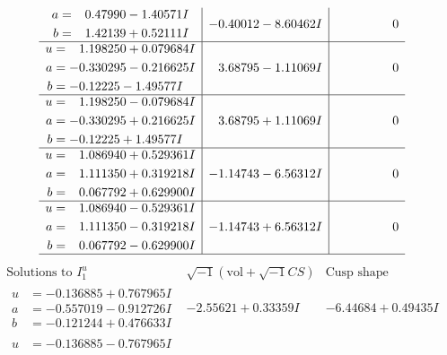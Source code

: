 \documentclass[1p]{elsarticle_modified}
\theoremstyle{definition}
\newcommand{\I}{\sqrt{-1}}
\begin{document}
$$\begin{array}{c|c|c}
\begin{aligned}
a &= \phantom{-}0.47990 - 1.40571 I \\
b &= \phantom{-}1.42139 + 0.52111 I\end{aligned}
 & -0.40012 - 8.60462 I & \phantom{-0.000000 } 0 \\ \hline\begin{aligned}
u &= \phantom{-}1.198250 + 0.079684 I \\
a &= -0.330295 - 0.216625 I \\
b &= -0.12225 - 1.49577 I\end{aligned}
 & \phantom{-}3.68795 - 1.11069 I & \phantom{-0.000000 } 0 \\ \hline\begin{aligned}
u &= \phantom{-}1.198250 - 0.079684 I \\
a &= -0.330295 + 0.216625 I \\
b &= -0.12225 + 1.49577 I\end{aligned}
 & \phantom{-}3.68795 + 1.11069 I & \phantom{-0.000000 } 0 \\ \hline\begin{aligned}
u &= \phantom{-}1.086940 + 0.529361 I \\
a &= \phantom{-}1.111350 + 0.319218 I \\
b &= \phantom{-}0.067792 + 0.629900 I\end{aligned}
 & -1.14743 - 6.56312 I & \phantom{-0.000000 } 0 \\ \hline\begin{aligned}
u &= \phantom{-}1.086940 - 0.529361 I \\
a &= \phantom{-}1.111350 - 0.319218 I \\
b &= \phantom{-}0.067792 - 0.629900 I\end{aligned}
 & -1.14743 + 6.56312 I & \phantom{-0.000000 } 0\\
 \hline 
 \end{array}$$\newpage$$\begin{array}{c|c|c}  
\text{Solutions to }I^u_{1}& \I (\text{vol} + \sqrt{-1}CS) & \text{Cusp shape}\\
 \hline 
\begin{aligned}
u &= -0.136885 + 0.767965 I \\
a &= -0.557019 - 0.912726 I \\
b &= -0.121244 + 0.476633 I\end{aligned}
 & -2.55621 + 0.33359 I & -6.44684 + 0.49435 I \\ \hline\begin{aligned}
u &= -0.136885 - 0.767965 I \\

\end{aligned}
\end{array}$$
\end{document}
